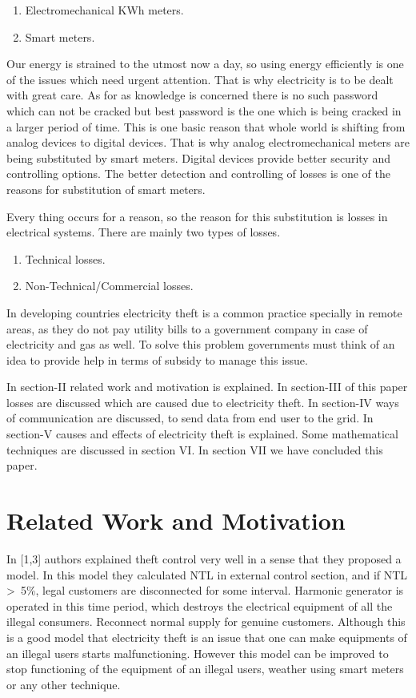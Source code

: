 \documentclass[10pt, conference, compsocconf]{IEEEtran}
\begin{document}
\begin{enumerate}
\item
Electromechanical KWh meters.
\item
Smart meters.
\end{enumerate}

Our energy is strained to the utmost now a day, so using energy efficiently is one of the issues which need urgent attention. That is why electricity is to be dealt with great care. As for as knowledge is concerned there is no such password which can not be cracked but best password is the one which is being cracked in a larger period of time. This is one basic reason that whole world is shifting from analog devices to digital devices. That is why analog electromechanical meters are being substituted by smart meters.
Digital devices provide better security and controlling options. The better detection and controlling of losses is one of the reasons for substitution of smart meters.

Every thing occurs for a reason, so the reason for this substitution is losses in electrical systems. There are mainly two types of losses.

\begin{enumerate}
\item
Technical losses.
\item
Non-Technical/Commercial losses.
\end{enumerate}

In developing countries electricity theft is a common practice specially in remote areas, as they do not pay utility bills to a government company in case of electricity and gas as well. To solve this problem governments must think of an idea to provide help in terms of subsidy to manage this issue.

In section-II related work and motivation is explained. In section-III of this paper losses are discussed which are caused due to electricity theft. In section-IV ways of communication are discussed, to send data from end user to the grid. In section-V causes and effects of electricity theft is explained. Some mathematical techniques are discussed in section VI. In section VII we have concluded this paper.

\section{Related Work and Motivation}
In [1,3] authors explained theft control very well in a sense that they proposed a model. In this model they calculated NTL in external control section, and if NTL \textgreater\ 5\%, legal customers are disconnected for some interval. Harmonic generator is operated in this time period, which destroys the electrical equipment of all the illegal consumers. Reconnect normal supply for genuine customers. Although this is a good model that electricity theft is an issue that one can make equipments of an illegal users starts malfunctioning. However this model can be improved to stop functioning of the equipment of an illegal users, weather using smart meters or any other technique.
\end{document}
